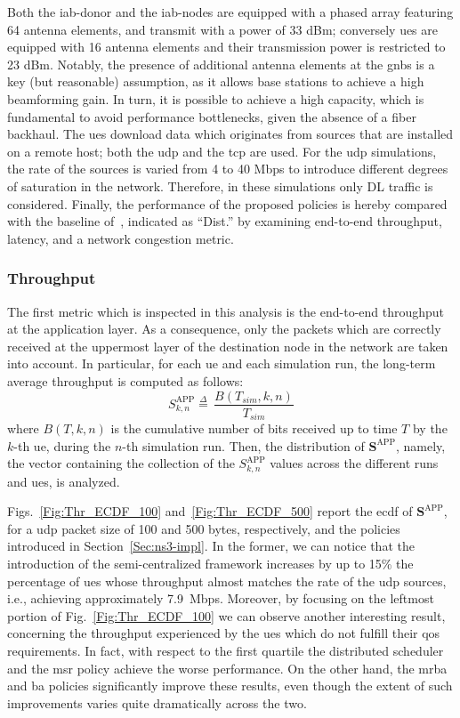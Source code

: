 Both the \gls{iab}-donor and the \gls{iab}-nodes are equipped with a phased array featuring 64 antenna elements, and transmit with a power of 33 dBm; conversely \glspl{ue} are equipped with 16 antenna elements and their transmission power is restricted to 23 dBm. Notably, the presence of additional antenna elements at the \glspl{gnb} is a key (but reasonable) assumption, as it allows base stations to achieve a high beamforming gain. In turn, it is possible to achieve a high capacity, which is fundamental to avoid performance bottlenecks, given the absence of a fiber backhaul.
The \glspl{ue} download data which originates from sources that are installed on a remote host; both the \gls{udp} and the \gls{tcp} are used. For the \gls{udp} simulations, the rate of the sources is varied from 4 to 40 Mbps to introduce different degrees of saturation in the network. Therefore, in these simulations only DL traffic is considered.
Finally, the performance of the proposed policies is hereby compared with the baseline of~\cite{polese2018end}, indicated as ``Dist.'' by examining end-to-end throughput, latency, and a network congestion metric.

\subsubsection{Throughput}
\label{subsec_thr}

The first metric which is inspected in this analysis is the end-to-end throughput at the application layer. As a consequence, only the packets which are correctly received at the uppermost layer of the destination node in the network are taken into account. In particular, for each \gls{ue} and each simulation run, the long-term average throughput is computed as follows:
\[ S^{\mathrm{APP}}_{k, n} \mathop = \limits^{\Delta} \, \frac{B(T_{sim}, k, n)}{T_{sim}} \]
where $B(T, k, n)$ is the cumulative number of bits received up to time $T$ by the $k$-th \gls{ue}, during the $n$-th simulation run. Then, the distribution of 
$\mathbf{S}^{\mathrm{APP}}$, namely, the vector containing the collection of the $S^{\mathrm{APP}}_{k, n}$ values across the different runs and \glspl{ue}, is analyzed.

Figs.~\ref{Fig:Thr_ECDF_100} and~\ref{Fig:Thr_ECDF_500} report the \gls{ecdf} of $\mathbf{S}^{\mathrm{APP}}$, for a \gls{udp} packet size of 100 and 500 bytes, respectively, and the policies introduced in Section~\ref{Sec:ns3-impl}. In the former, we can notice that the introduction of the semi-centralized framework increases by up to 15\% the percentage of \glspl{ue} whose throughput almost matches the rate of the \gls{udp} sources, i.e., achieving approximately 7.9~Mbps.
Moreover, by focusing on the leftmost portion of Fig.~\ref{Fig:Thr_ECDF_100} we can observe another interesting result, concerning the throughput experienced by the \glspl{ue} which do not fulfill their \gls{qos} requirements. In fact, with respect to the first quartile the distributed scheduler and the \gls{msr} policy achieve the worse performance.
On the other hand, the \gls{mrba} and \gls{ba} policies significantly improve these results, even though the extent of such improvements varies quite dramatically across the two.

